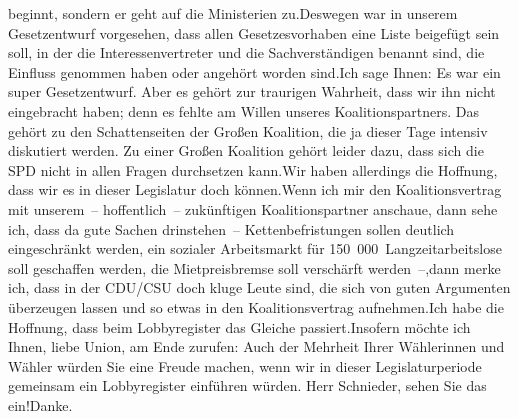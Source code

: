 \documentclass{article}
\begin{document}
beginnt, sondern er geht auf die Ministerien zu.Deswegen war in unserem Gesetzentwurf vorgesehen, dass allen Gesetzesvorhaben eine Liste beigefügt sein soll, in der die Interessenvertreter und die Sachverständigen benannt sind, die Einfluss genommen haben oder angehört worden sind.Ich sage Ihnen: Es war ein super Gesetzentwurf. Aber es gehört zur traurigen Wahrheit, dass wir ihn nicht eingebracht haben; denn es fehlte am Willen unseres Koalitionspartners. Das gehört zu den Schattenseiten der Großen Koalition, die ja dieser Tage intensiv diskutiert werden. Zu einer Großen Koalition gehört leider dazu, dass sich die SPD nicht in allen Fragen durchsetzen kann.Wir haben allerdings die Hoffnung, dass wir es in dieser Legislatur doch können.Wenn ich mir den Koalitionsvertrag mit unserem – hoffentlich – zukünftigen Koalitionspartner anschaue, dann sehe ich, dass da gute Sachen drinstehen – Kettenbefristungen sollen deutlich eingeschränkt werden, ein sozialer Arbeitsmarkt für 150 000 Langzeitarbeitslose soll geschaffen werden, die Mietpreisbremse soll verschärft werden –,dann merke ich, dass in der CDU/CSU doch kluge Leute sind, die sich von guten Argumenten überzeugen lassen und so etwas in den Koalitionsvertrag aufnehmen.Ich habe die Hoffnung, dass beim Lobbyregister das Gleiche passiert.Insofern möchte ich Ihnen, liebe Union, am Ende zurufen: Auch der Mehrheit Ihrer Wählerinnen und Wähler würden Sie eine Freude machen, wenn wir in dieser Legislaturperiode gemeinsam ein Lobbyregister einführen würden. Herr Schnieder, sehen Sie das ein!Danke.
\end{document}
